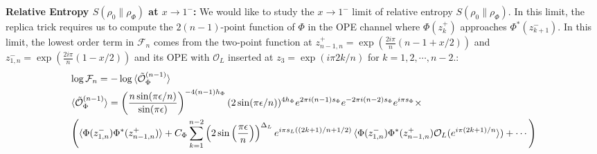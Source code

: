 \documentclass[11pt]{article}
\newcommand{\ep}{\epsilon}
\newcommand{\mO}{\mathcal{O}}
\newcommand{\nn}{\nonumber}
\newcommand{\lb}{\left(}
\newcommand{\rb}{\right)}
\newcommand{\NL}[1]{\textcolor{blue}{#1}}
\newcommand{\JM}[1]{\textcolor{orange}{#1}}
\begin{document}
{\bf Relative Entropy $S(\rho_0\|\rho_\Phi)$ at $x\to 1^-$:}
We would like to study the $x\to 1^-$ limit of relative entropy $S(\rho_0\|\rho_\Phi)$. In this limit, the replica trick requires us to compute the $2(n-1)$-point function of $\Phi$ in the OPE channel where $\Phi(z_k^+)$ approaches $\Phi^*(z_{k+1}^-)$. In this limit, the lowest order term in $\mathcal{F}_n$ comes from the two-point function at $z_{n-1,n}^+=\exp(\frac{2i\pi}{n}(n-1+x/2))$ and $z_{1,n}^-=\exp(\frac{2i\pi}{n}(1-x/2))$ and its OPE with $\mO_L$ inserted at $z_3 = \exp (i\pi 2k/n)$ for $k = 1,2, \cdots, n-2.$:
\begin{align}
  &\log\mathcal{F}_n=-\log\braket{\tilde{\mO}_{\Phi}^{(n-1)}}\nn \\
&\braket{\tilde{\mO}_{\Phi}^{(n-1)}}=\lb \frac{n \sin(\pi\ep/n)}{\sin(\pi\ep)}\rb^{-4(n-1)h_\Phi}(2\sin(\pi\ep/n))^{4h_\Phi}e^{2\pi i(n-1)s_\Phi  }e^{-2\pi i(n-2) s_\Phi}e^{i\pi s_\Phi}\times \nn\\
&\lb\braket{\Phi(z^-_{1,n})\Phi^*(z^+_{n-1,n})}+C_\Phi\sum_{k=1}^{n-2} \lb 2\sin\lb\frac{\pi\epsilon}{n}\rb\rb^{\Delta_L}e^{i\pi s_L((2k+1)/n + 1/2)}\braket{\Phi(z^-_{1,n})\Phi^*(z^+_{n-1,n})\mO_L(e^{ i\pi (2k+1)/n}})+\cdots\rb
\end{align}
\end{document}
